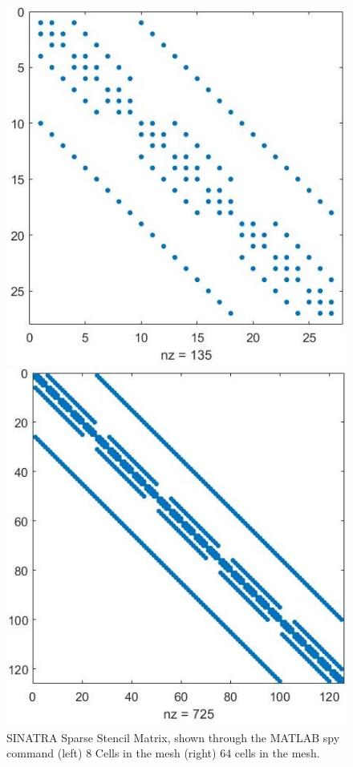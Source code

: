 \begin{figure}
    \centering
  \begin{minipage}[b]{0.49\textwidth}
    \includegraphics[width=\textwidth]{figures/sparse_8.jpg}
  \end{minipage} %
  \begin{minipage}[b]{0.49\textwidth}
    \includegraphics[width=\textwidth]{figures/sparse_64.jpg}
  \end{minipage}
  \caption[SINATRA Sparse Stencil Matrix]{SINATRA Sparse Stencil Matrix\textmd{, shown through the MATLAB\textsuperscript{\textregistered} spy command (left) 8 Cells in the mesh (right) 64 cells in the mesh.}}
  \label{fig:sparse}
\end{figure}



